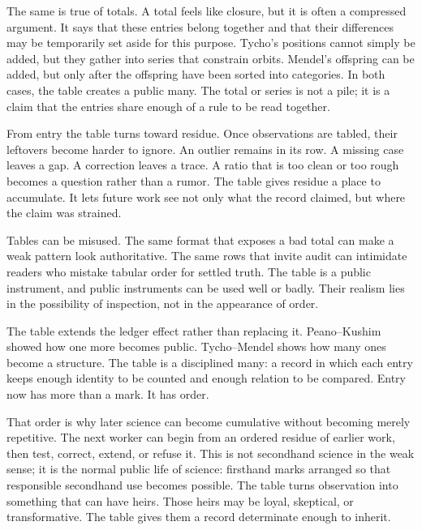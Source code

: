 The same is true of totals. A total feels like closure, but it is often a
compressed argument. It says that these entries belong together and that
their differences may be temporarily set aside for this purpose. Tycho's
positions cannot simply be added, but they gather into series that
constrain orbits. Mendel's offspring can be added, but only after the
offspring have been sorted into categories. In both cases, the table
creates a public many. The total or series is not a pile; it is a claim
that the entries share enough of a rule to be read together.

From entry the table turns toward residue. Once observations are tabled,
their leftovers become harder to ignore. An outlier remains in its row. A
missing case leaves a gap. A correction leaves a trace. A ratio that is too
clean or too rough becomes a question rather than a rumor. The table gives
residue a place to accumulate. It lets future work see not only what the
record claimed, but where the claim was strained.

Tables can be misused. The same format that exposes a bad total can make a
weak pattern look authoritative. The same rows that invite audit can
intimidate readers who mistake tabular order for settled truth. The table
is a public instrument, and public instruments can be used well or badly.
Their realism lies in the possibility of inspection, not in the appearance
of order.

The table extends the ledger effect rather than replacing it. Peano--Kushim
showed how one more becomes public. Tycho--Mendel shows how many ones
become a structure. The table is a disciplined many: a record in which each
entry keeps enough identity to be counted and enough relation to be
compared. Entry now has more than a mark. It has order.

That order is why later science can become cumulative without becoming
merely repetitive. The next worker can begin from an ordered residue of
earlier work, then test, correct, extend, or refuse it. This is not
secondhand science in the weak sense; it is the normal public life of
science: firsthand marks arranged so that responsible secondhand use
becomes possible. The table turns observation into something that can have
heirs. Those heirs may be loyal, skeptical, or transformative. The table
gives them a record determinate enough to inherit.

